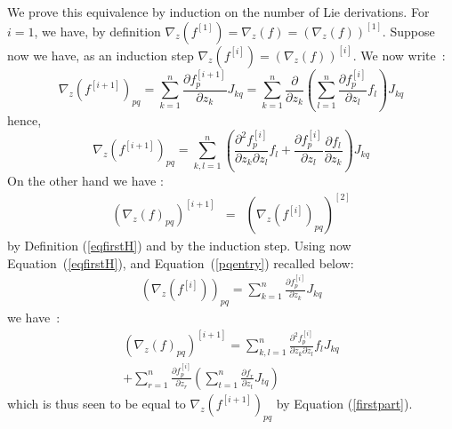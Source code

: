 \documentclass{sig-alternate-05-2015}
\begin{document}
We prove this equivalence by induction on the number of Lie derivations. 
For $i=1$, we have, by definition $\nabla_z(f^{[1]})
=\nabla_z(f)=(\nabla_z(f))^{[1]}$. Suppose now we have, as an induction
step $\nabla_z(f^{[i]})=(\nabla_z(f))^{[i]}$. We now write~:
$$
\nabla_z(f^{[i+1]})_{pq} 
= 
\sum\limits_{k=1}^n \frac{\partial f^{[i+1]}_p}{\partial z_k} J_{kq} 
= 
\sum\limits_{k=1}^n \frac{\partial}{\partial z_k} \left(
\sum\limits_{l=1}^n \frac{\partial{f^{[i]}_p}}{\partial z_l} f_l
\right)J_{kq}
$$
\noindent hence, 
\begin{equation}
\nabla_z(f^{[i+1]})_{pq} =  \sum\limits_{k,l=1}^n \left(\frac{\partial^2 f_p^{[i]}}{\partial z_k \partial z_l} f_l
+\frac{\partial f_p^{[i]}}{\partial z_l}\frac{\partial f_l}{\partial z_k}\right)
J_{kq}
\label{firstpart}
\end{equation}
On the other hand we have : 
$$\begin{array}{rcl}
(\nabla_z(f)_{pq})^{[i+1]} & = &
(\nabla_z(f^{[i]})_{pq})^{[2]}
\end{array}$$
\noindent by Definition (\ref{eqfirstH}) and by the induction step. 
Using now Equation~(\ref{eqfirstH}), and Equation~(\ref{pqentry}) recalled below:
$$\begin{array}{rcl}
(\nabla_z(f^{[i]}))_{pq} = \sum\limits_{k=1}^n \frac{\partial f^{[i]}_p}{\partial z_k} J_{kq}
\end{array}$$
\noindent we have~:  
\begin{multline}
(\nabla_z(f)_{pq})^{[i+1]}  = 
\sum\limits_{k,l=1}^n \frac{\partial^2 f_p^{[i]}}{\partial z_k \partial z_l} f_l J_{kq} \\
+ \sum\limits_{r=1}^n \frac{\partial f_p^{[i]}}{\partial z_r}\left(\sum\limits_{t=1}^n
\frac{\partial f_r}{\partial z_t} J_{tq} \right)
\end{multline}
\noindent which is thus seen to be equal to $\nabla_z(f^{[i+1]})_{pq}$ by
Equation (\ref{firstpart}). 
\end{document}
